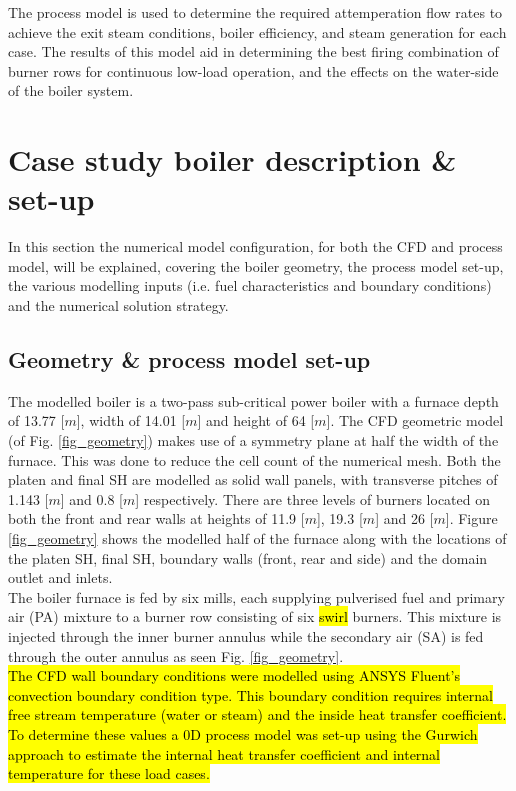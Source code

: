 \documentclass[twocolumn,10pt]{asme2ej}
\begin{document}
The process model is used to determine the required attemperation flow rates to achieve the exit steam conditions, boiler efficiency, and steam generation for each case. The results of this model aid in determining the best firing combination of burner rows for continuous low-load operation, and the effects on the water-side of the boiler system.

\section{Case study boiler description \& set-up}
In this section the numerical model configuration, for both the CFD and process model, will be explained, covering the boiler geometry, the process model set-up, the various  modelling inputs (i.e. fuel characteristics and boundary conditions) and the numerical solution strategy.

\subsection{Geometry \& process model set-up} \label{sec_set_up}
The modelled  boiler is a two-pass sub-critical power boiler with a furnace depth of 13.77 [$m$], width of 14.01 [$m$] and height of 64 [$m$]. The CFD geometric model (of Fig. \ref{fig_geometry}) makes use of a symmetry plane at half the width of the furnace. This was done to reduce the cell count of the numerical mesh. Both the platen and final SH are modelled as solid wall panels, with transverse pitches of 1.143 [$m$] and 0.8 [$m$] respectively. There are three levels of burners located on both the front and rear walls at heights of 11.9 [$m$], 19.3 [$m$] and 26 [$m$]. Figure \ref{fig_geometry} shows the modelled half of the furnace along with the locations of the platen SH, final SH, boundary walls (front, rear and side) and the domain outlet and inlets.\\

The boiler furnace is fed by six mills, each supplying pulverised fuel and primary air (PA) mixture to a burner row consisting of six \hl{swirl} burners. This mixture is injected through the inner burner annulus while the secondary air (SA) is fed through the outer annulus as seen Fig. \ref{fig_geometry}.\\ 

\hl{The CFD wall boundary conditions were modelled using ANSYS Fluent's convection boundary condition type. This boundary condition requires internal free stream temperature (water or steam) and the inside heat transfer coefficient. To determine these values a 0D process model was set-up using the Gurwich approach to estimate the internal heat transfer coefficient and internal temperature for these load cases.}\\
\end{document}
